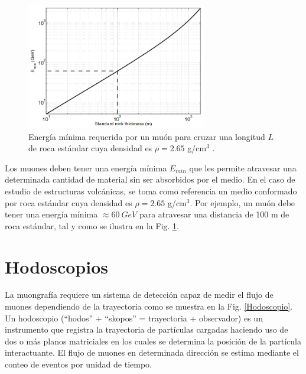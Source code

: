 

\begin{figure}[h!]
\begin{center}
\includegraphics[width=0.7\textwidth]{Figures/Min_Energy}
\caption[Energía mínima requerida por un muón para cruzar una longitud $L$ de roca estándar cuya densidad es $\rho = 2.65 \ g/cm^3$]{Energía mínima requerida por un muón para cruzar una longitud $L$ de roca estándar cuya densidad es $\rho = 2.65$ g/cm$^3$ \cite{Catalano2016, Lesparre2010, Valencia2016, Vesga2018}.}
\label{E_min}
\end{center}
\end{figure}

Los muones deben tener una energía mínima $E_{min}$ que les permite atravesar una determinada cantidad de material sin ser absorbidos por el medio.
 En el caso de estudio de estructuras volcánicas, se toma como referencia un medio conformado por roca estándar cuya densidad es $\rho = 2.65$ g/cm$^3$. Por ejemplo, un muón debe tener una energía mínima $\approx 60 \ GeV$ para atravesar una distancia de 100 m de roca estándar, tal y como se ilustra en la Fig. \ref{E_min}.


\section{Hodoscopios}

La muongrafía requiere un sistema de detección capaz de medir el flujo de muones dependiendo de la trayectoria como se muestra en la Fig. \ref{Hodoscopio}. Un hodoscopio (``hodos'' + ``skopos'' = trayectoria + observador) es un instrumento que registra la trayectoria de partículas cargadas haciendo uso de dos o más planos matriciales en los cuales se determina la posición de la partícula interactuante. El flujo de muones en determinada dirección se estima mediante el conteo de eventos por unidad de tiempo.\\

